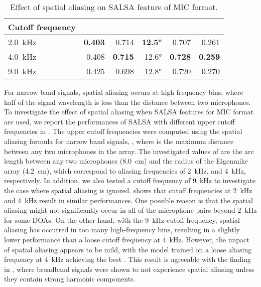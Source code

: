 \documentclass[journal]{IEEEtran}
\newcommand{\Eseld}{\xspace}
\begin{document}
\begin{table}[t]
    \centering
    \setlength\tabcolsep{3pt}
    \caption{Effect of spatial aliasing on SALSA feature of MIC format.}
    \noindent\begin{tabularx}{\columnwidth}{Xrrrrr}
    \toprule 
        Cutoff frequency 
        &  
        & 
        & 
        &  
        &  \\
    \midrule
        \SI{2.0}{\kilo\hertz}          & \bf{0.403} & 0.714 & \bf{12.5\si{\degree}} & 0.707 & 0.261 \\
        \SI{4.0}{\kilo\hertz}          & 0.408 & \bf{0.715} & 12.6\si{\degree} & \bf{0.728} & \bf{0.259} \\
        \SI{9.0}{\kilo\hertz}          & 0.425 & 0.698 & 12.8\si{\degree} & 0.720 & 0.270 \\
    \bottomrule
    \end{tabularx}
    \label{tab:salsa_mic_aliasing}
\end{table}

For narrow band signals, spatial aliasing occurs at high frequency bins, where half of the signal wavelength is less than the distance between two microphones. 
To investigate the effect of spatial aliasing when SALSA features for MIC format are used, we report the performances of SALSA with different upper cutoff frequencies in . The upper cutoff frequencies were computed using the spatial aliasing formula for narrow band signals, , where  is the maximum distance between any two microphones in the array. The investigated values of  are the arc length between any two microphones (\SI{8.0}{\centi\meter}) and the radius of the Eigenmike array (\SI{4.2}{\centi\meter}), which correspond to aliasing frequencies of \SI{2}{\kilo\hertz}, and \SI{4}{\kilo\hertz}, respectively. In addition, we also tested a cutoff frequency of \SI{9}{\kilo\hertz} to investigate the case where spatial aliasing is ignored.  shows that cutoff frequencies at \SI{2}{\kilo\hertz} and \SI{4}{\kilo\hertz} result in similar performances. One possible reason is that the spatial aliasing might not significantly occur in all of the microphone pairs beyond \SI{2}{\kilo\hertz} for some DOAs. On the other hand, with the \SI{9}{\kilo\hertz} cutoff frequency, spatial aliasing has occurred in too many high-frequency bins, resulting in a slightly lower performance than a loose cutoff frequency at \SI{4}{\kilo\hertz}. However, the impact of spatial aliasing appears to be mild, with the model trained on a loose aliasing frequency at \SI{4}{\kilo\hertz} achieving the best \Eseld. This result is agreeable with the finding in \cite{Dmochowski2009OnArrays}, where broadband signals were shown to not experience spatial aliasing unless they contain strong harmonic components. 
\end{document}
